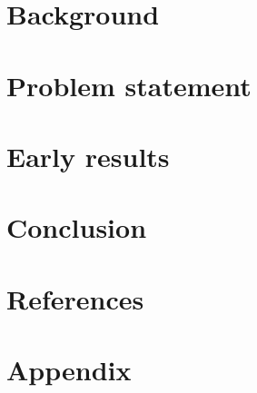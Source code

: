 
\section{Background}




\section{Problem statement}




\section{Early results}








\section{Conclusion}


\section{References}


\section{Appendix}



